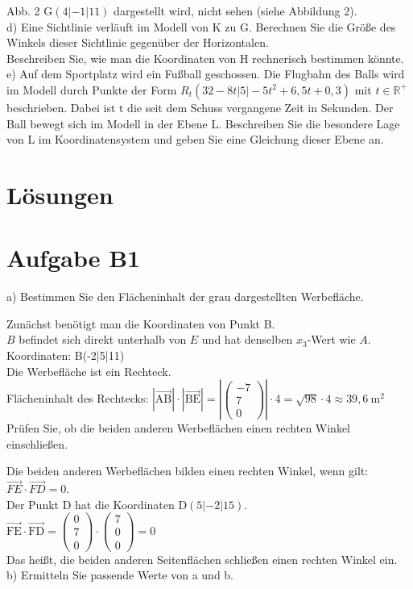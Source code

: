 \documentclass[10pt]{article}
\begin{document}
Abb. 2 $\mathrm{G}(4|-1| 11)$ dargestellt wird, nicht sehen (siehe Abbildung 2).\\
d) Eine Sichtlinie verläuft im Modell von K zu G. Berechnen Sie die Größe des Winkels dieser Sichtlinie gegenüber der Horizontalen.\\
Beschreiben Sie, wie man die Koordinaten von H rechnerisch bestimmen könnte.\\
e) Auf dem Sportplatz wird ein Fußball geschossen. Die Flugbahn des Balls wird im Modell durch Punkte der Form $R_{t}\left(32-8 t|5|-5 t^{2}+6,5 t+0,3\right)$ mit $t \in \mathbb{R}^{+}$ beschrieben. Dabei ist t die seit dem Schuss vergangene Zeit in Sekunden. Der Ball bewegt sich im Modell in der Ebene L. Beschreiben Sie die besondere Lage von L im Koordinatensystem und geben Sie eine Gleichung dieser Ebene an.

\section*{Lösungen}
\section*{Aufgabe B1}
a) Bestimmen Sie den Flächeninhalt der grau dargestellten Werbefläche.

Zunächst benötigt man die Koordinaten von Punkt B.\\
$B$ befindet sich direkt unterhalb von $E$ und hat denselben $x_{3}$-Wert wie $A$.\\
Koordinaten: B(-2|5|11)\\
Die Werbefläche ist ein Rechteck.\\
Flächeninhalt des Rechtecks: $|\overrightarrow{\mathrm{AB}}| \cdot|\overrightarrow{\mathrm{BE}}|=\left|\left(\begin{array}{c}-7 \\ 7 \\ 0\end{array}\right)\right| \cdot 4=\sqrt{98} \cdot 4 \approx 39,6 \mathrm{~m}^{2}$\\
Prüfen Sie, ob die beiden anderen Werbeflächen einen rechten Winkel einschließen.

Die beiden anderen Werbeflächen bilden einen rechten Winkel, wenn gilt:\\
$\overrightarrow{F E} \cdot \overrightarrow{F D}=0$.\\
Der Punkt D hat die Koordinaten $\mathrm{D}(5|-2| 15)$.\\
$\overrightarrow{\mathrm{FE}} \cdot \overrightarrow{\mathrm{FD}}=\left(\begin{array}{l}0 \\ 7 \\ 0\end{array}\right) \cdot\left(\begin{array}{l}7 \\ 0 \\ 0\end{array}\right)=0$\\
Das heißt, die beiden anderen Seitenflächen schließen einen rechten Winkel ein.\\
b) Ermitteln Sie passende Werte von a und b.
\end{document}
